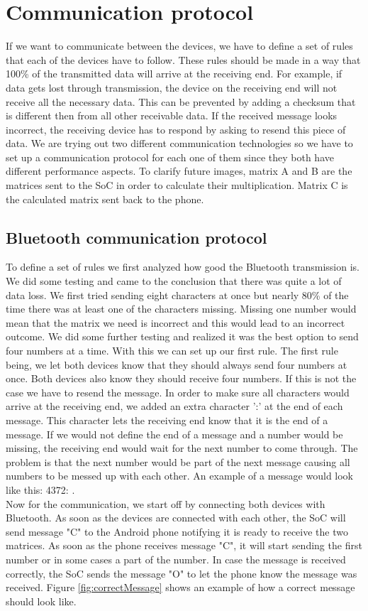 \documentclass[a4paper, 11pt]{report}
\begin{document}
	
\section{Communication protocol}
If we want to communicate between the devices, we have to define a set of rules that each of the devices have to follow. These rules should be made in a way that 100\% of the transmitted data will arrive at the receiving end. For example, if data gets lost through transmission, the device on the receiving end will not receive all the necessary data. This can be prevented by adding a checksum that is different then from all other receivable data. If the received message looks incorrect, the receiving device has to respond by asking to resend this piece of data. We are trying out two different communication technologies so we have to set up a communication protocol for each one of them since they both have different performance aspects. To clarify future images, matrix A and B are the matrices sent to the SoC in order to calculate their multiplication. Matrix C is the calculated matrix sent back to the phone.

	\subsection{Bluetooth communication protocol}\label{subsec:bluetoothProtocol}
To define a set of rules we first analyzed how good the Bluetooth transmission is. We did some testing and came to the conclusion that there was quite a lot of data loss. We first tried sending eight characters at once but nearly 80\% of the time there was at least one of the characters missing. Missing one number would mean that the matrix we need is incorrect and this would lead to an incorrect outcome. We did some further testing and realized it was the best option to send four numbers at a time. With this we can set up our first rule. The first rule being, we let both devices know that they should always send four numbers at once. Both devices also know they should receive four numbers. If this is not the case we have to resend the message.
In order to make sure all characters would arrive at the receiving end, we added an extra character ':' at the end of each message. This character lets the receiving end know that it is the end of a message. If we would not define the end of a message and a number would be missing, the receiving end would wait for the next number to come through. The problem is that the next number would be part of the next message causing all numbers to be messed up with each other. An example of a message would look like this: 4372: .\\
Now for the communication, we start off by connecting both devices with Bluetooth. As soon as the devices are connected with each other, the SoC will send message "C" to the Android phone notifying it is ready to receive the two matrices. As soon as the phone receives message "C", it will start sending the first number or in some cases a part of the number. In case the message is received correctly, the SoC sends the message "O" to let the phone know the message was received. Figure \ref{fig:correctMessage} shows an example of how a correct message should look like.
\end{document}
